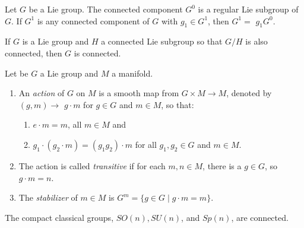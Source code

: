 \documentclass[11pt]{homework}
\begin{document}
\begin{lemma}
    Let $G$ be a Lie group. The connected component $G^{0}$ is a regular Lie subgroup of $G .$ If $G^{1}$ is any connected component of $G$ with $g_{1} \in G^{1}$, then $G^{1}=$ $g_{1} G^{0}$.
\end{lemma}

\begin{theorem}
    If $G$ is a Lie group and $H$ a connected Lie subgroup so that $G / H$ is also connected, then $G$ is connected.
\end{theorem}


\begin{definition}
    Let be $G$ a Lie group and $M$ a manifold.
    \begin{enumerate}
        \item An \textit{action} of $G$ on $M$ is a smooth map from $G \times M \rightarrow M$, denoted by $(g, m) \rightarrow$ $g \cdot m$ for $g \in G$ and $m \in M$, so that:
        \begin{enumerate}
            \item $e \cdot m=m$, all $m \in M$ and
            \item $g_{1} \cdot\left(g_{2} \cdot m\right)=\left(g_{1} g_{2}\right) \cdot m$ for all $g_{1}, g_{2} \in G$ and $m \in M$.
        \end{enumerate}
        \item  The action is called \textit{transitive} if for each $m, n \in M$, there is a $g \in G$, so $g \cdot m=n$.
        \item The \textit{stabilizer} of $m \in M$ is $G^{m}=\{g \in G \mid g \cdot m=m\}$.
    \end{enumerate}
\end{definition}

\begin{theorem}
    The compact classical groups, $SO(n), SU(n)$, and $Sp(n)$, are connected.
\end{theorem}
\end{document}
